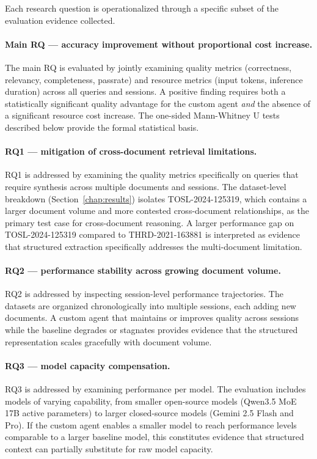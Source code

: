 Each research question is operationalized through a specific subset of the evaluation
evidence collected.

\paragraph{Main RQ — accuracy improvement without proportional cost increase.}
The main RQ is evaluated by jointly examining quality metrics (correctness, relevancy,
completeness, passrate) and resource metrics (input tokens, inference duration) across
all queries and sessions. A positive finding requires both a statistically significant
quality advantage for the custom agent \emph{and} the absence of a significant resource
cost increase. The one-sided Mann-Whitney U tests described below provide the formal
statistical basis.

\paragraph{RQ1 — mitigation of cross-document retrieval limitations.}
RQ1 is addressed by examining the quality metrics specifically on queries that require
synthesis across multiple documents and sessions. The dataset-level breakdown
(Section~\ref{chap:results}) isolates TOSL-2024-125319, which contains a larger document volume
and more contested cross-document relationships, as the primary test case for cross-document
reasoning. A larger performance gap on TOSL-2024-125319 compared to THRD-2021-163881 is interpreted
as evidence that structured extraction specifically addresses the multi-document
limitation.

\paragraph{RQ2 — performance stability across growing document volume.}
RQ2 is addressed by inspecting session-level performance trajectories. The datasets are
organized chronologically into multiple sessions, each adding new documents. A custom
agent that maintains or improves quality across sessions while the baseline degrades
or stagnates provides evidence that the structured representation scales gracefully with
document volume.

\paragraph{RQ3 — model capacity compensation.}
RQ3 is addressed by examining performance per model. The evaluation includes models of
varying capability, from smaller open-source models (Qwen3.5 MoE 17B active parameters)
to larger closed-source models (Gemini 2.5 Flash and Pro). If the custom agent
enables a smaller model to reach performance levels comparable to a larger baseline model,
this constitutes evidence that structured context can partially substitute for raw model
capacity.

